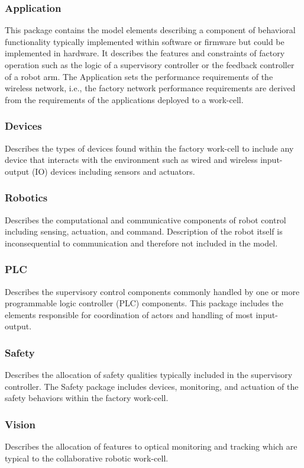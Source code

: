 \subsubsection{Application}  This package contains the model elements describing a component of behavioral functionality typically implemented within software or firmware but could be implemented in hardware.  It describes the features and constraints of factory operation such as the logic of a supervisory controller or the feedback controller of a robot arm.  The Application sets the performance requirements of the wireless network, i.e., the factory network performance requirements are derived from the requirements of the applications deployed to a work-cell.

\subsubsection{Devices} Describes the types of devices found within the factory work-cell to include any device that interacts with the environment such as wired and wireless input-output (IO) devices including sensors and actuators.

\subsubsection{Robotics} Describes the computational and communicative components of robot control including sensing, actuation, and command.  Description of the robot itself is inconsequential to communication and therefore not included in the model.

\subsubsection{PLC} Describes the supervisory control components commonly handled by one or more programmable logic controller (PLC) components.  This package includes the elements responsible for coordination of actors and handling of most input-output.

\subsubsection{Safety} Describes the allocation of safety qualities typically included in the supervisory controller.  The Safety package includes devices, monitoring, and actuation of the safety behaviors within the factory work-cell.

\subsubsection{Vision} Describes the allocation of features to optical monitoring and tracking which are typical to the collaborative robotic work-cell.

